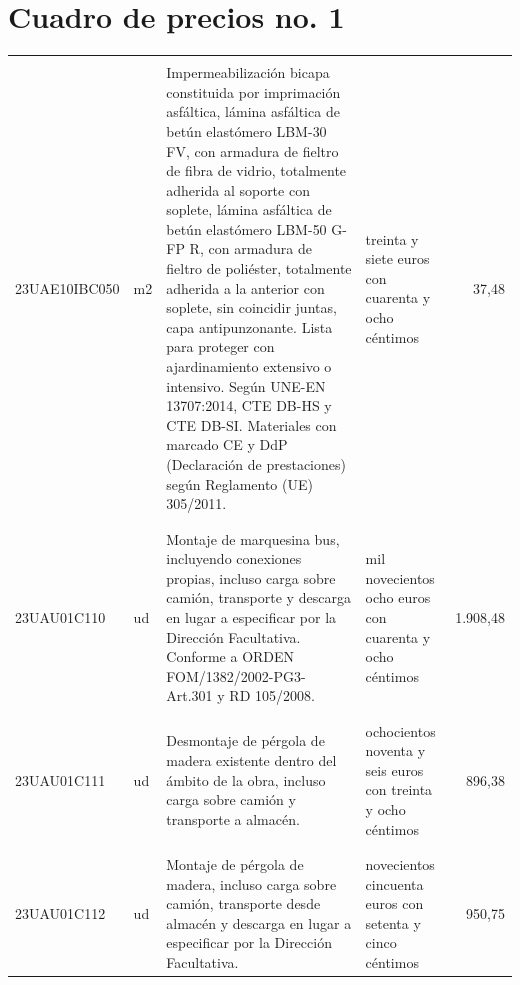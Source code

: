 \documentclass{book}%
\begin{document}
\part{Cuadro de precios no. 1}%
\label{sec:Cuadrodepreciosno.1}%
\parttoc%
\setcounter{chapter}{0}%
\small%
%
%
%
\tablelasttail{\hline%
}%
\begin{supertabular}{|l|l|p{5cm}|p{3cm}|r|}%
&&&&\\%
23UAE10IBC050&m2&Impermeabilización bicapa constituida por imprimación asfáltica, lámina asfáltica de betún elastómero LBM{-}30 FV, con armadura de fieltro de fibra de vidrio, totalmente adherida al soporte con soplete, lámina asfáltica de betún elastómero LBM{-}50 G{-}FP R, con armadura de fieltro de poliéster, totalmente adherida a la anterior con soplete, sin coincidir juntas, capa antipunzonante. Lista para proteger con ajardinamiento extensivo o intensivo. Según UNE{-}EN 13707:2014, CTE DB{-}HS y CTE DB{-}SI. Materiales con marcado CE y DdP (Declaración de prestaciones) según Reglamento (UE) 305/2011.&treinta y siete euros con cuarenta y ocho céntimos&37,48\\%
&&&&\\%
&&&&\\%
23UAU01C110&ud&Montaje de marquesina bus, incluyendo conexiones propias, incluso carga sobre camión, transporte y descarga en lugar a especificar por la Dirección Facultativa. Conforme a ORDEN FOM/1382/2002{-}PG3{-}Art.301 y RD 105/2008.&mil novecientos ocho euros con cuarenta y ocho céntimos&1.908,48\\%
&&&&\\%
&&&&\\%
23UAU01C111&ud&Desmontaje de pérgola de madera existente dentro del ámbito de la obra, incluso carga sobre camión y transporte a almacén.&ochocientos noventa y seis euros con treinta y ocho céntimos&896,38\\%
&&&&\\%
&&&&\\%
23UAU01C112&ud&Montaje de pérgola de madera, incluso carga sobre camión, transporte desde almacén y descarga en lugar a especificar por la Dirección Facultativa.&novecientos cincuenta euros con setenta y cinco céntimos&950,75\\%

\end{supertabular}
\end{document}
